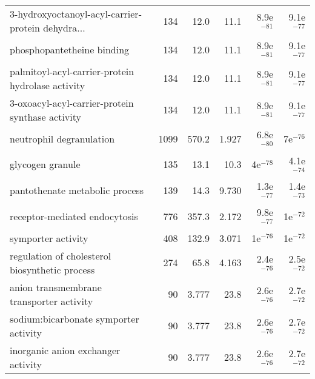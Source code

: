 \begin{longtable}{lrrrrr}
 3-hydroxyoctanoyl-acyl-carrier-protein dehydra... &                     134 &                    12.0 &       11.1 &         8.9e$^{-81}$ &         9.1e$^{-77}$ \\
                        phosphopantetheine binding &                     134 &                    12.0 &       11.1 &         8.9e$^{-81}$ &         9.1e$^{-77}$ \\
 palmitoyl-acyl-carrier-protein hydrolase activity &                     134 &                    12.0 &       11.1 &         8.9e$^{-81}$ &         9.1e$^{-77}$ \\
  3-oxoacyl-acyl-carrier-protein synthase activity &                     134 &                    12.0 &       11.1 &         8.9e$^{-81}$ &         9.1e$^{-77}$ \\
                          neutrophil degranulation &                    1099 &                   570.2 &      1.927 &         6.8e$^{-80}$ &           7e$^{-76}$ \\
                                  glycogen granule &                     135 &                    13.1 &       10.3 &           4e$^{-78}$ &         4.1e$^{-74}$ \\
                    pantothenate metabolic process &                     139 &                    14.3 &      9.730 &         1.3e$^{-77}$ &         1.4e$^{-73}$ \\
                     receptor-mediated endocytosis &                     776 &                   357.3 &      2.172 &         9.8e$^{-77}$ &           1e$^{-72}$ \\
                                symporter activity &                     408 &                   132.9 &      3.071 &           1e$^{-76}$ &           1e$^{-72}$ \\
    regulation of cholesterol biosynthetic process &                     274 &                    65.8 &      4.163 &         2.4e$^{-76}$ &         2.5e$^{-72}$ \\
          anion transmembrane transporter activity &                      90 &                   3.777 &       23.8 &         2.6e$^{-76}$ &         2.7e$^{-72}$ \\
             sodium:bicarbonate symporter activity &                      90 &                   3.777 &       23.8 &         2.6e$^{-76}$ &         2.7e$^{-72}$ \\
                inorganic anion exchanger activity &                      90 &                   3.777 &       23.8 &         2.6e$^{-76}$ &         2.7e$^{-72}$ \\

\end{longtable}
